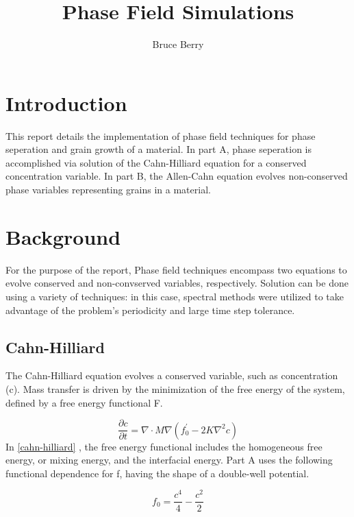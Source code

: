 \documentclass{report}
\begin{document}
    \title{Phase Field Simulations}
    \author{Bruce Berry}
    \maketitle

    \section{Introduction}
    This report details the implementation of phase field techniques for phase seperation and grain growth of a material.  In part A, phase seperation is accomplished via solution of the Cahn-Hilliard equation for a conserved concentration variable.  In part B, the Allen-Cahn equation evolves non-conserved phase variables representing grains in a material.

    \section{Background}
    For the purpose of the report, Phase field techniques encompass two equations to evolve conserved and non-convserved variables, respectively.  Solution can be done using a variety of techniques: in this case, spectral methods were utilized to take advantage of the problem's periodicity and large time step tolerance.

    \subsection{Cahn-Hilliard}
    The Cahn-Hilliard equation evolves a conserved variable, such as concentration (c).  Mass transfer is driven by the minimization of the free energy of the system, defined by a free energy functional F.

    \begin{equation} \label{cahn-hilliard}
        \frac{\partial c}{\partial t} = \nabla \cdot M\nabla (f^{'}_{0} - 2K\nabla^{2}c)
    \end{equation}
    In \eqref{cahn-hilliard} , the free energy functional includes the homogeneous free energy, or mixing energy, and the interfacial energy.  Part A uses the following functional dependence for f, having the shape of a double-well potential.

    \begin{equation} \label{f-function}
        f_0 = \frac{c^4}{4} - \frac{c^2}{2}
    \end{equation}
\end{document}

